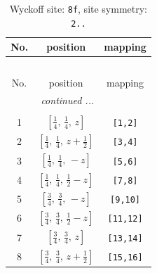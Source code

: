 \documentclass[fleqn,8pt]{jsarticle}
\begin{document}
\begin{longtable}{ccc}
\caption{Wyckoff site: {\tt 8f}, site symmetry: {\tt 2..}}
 \\
 \hline \hline
No. & position & mapping \\ \hline \endfirsthead

\multicolumn{2}{l}{\tablename\ \thetable{}} \\
 \hline \hline
No. & position & mapping \\ \hline \endhead

 \hline \hline
\multicolumn{2}{r}{\footnotesize\it continued ...} \\ \endfoot

 \hline \hline
\multicolumn{2}{r}{} \\ \endlastfoot

1 & $\left[ \frac{1}{4},\, \frac{1}{4},\, z \right]$ & {\tt [1,2]} \\ \hline
2 & $\left[ \frac{1}{4},\, \frac{1}{4},\, z + \frac{1}{2} \right]$ & {\tt [3,4]} \\ \hline
3 & $\left[ \frac{1}{4},\, \frac{1}{4},\, - z \right]$ & {\tt [5,6]} \\ \hline
4 & $\left[ \frac{1}{4},\, \frac{1}{4},\, \frac{1}{2} - z \right]$ & {\tt [7,8]} \\ \hline
5 & $\left[ \frac{3}{4},\, \frac{3}{4},\, - z \right]$ & {\tt [9,10]} \\ \hline
6 & $\left[ \frac{3}{4},\, \frac{3}{4},\, \frac{1}{2} - z \right]$ & {\tt [11,12]} \\ \hline
7 & $\left[ \frac{3}{4},\, \frac{3}{4},\, z \right]$ & {\tt [13,14]} \\ \hline
8 & $\left[ \frac{3}{4},\, \frac{3}{4},\, z + \frac{1}{2} \right]$ & {\tt [15,16]} \\
\end{longtable}
\renewcommand{\arraystretch}{1.2}
\end{document}

